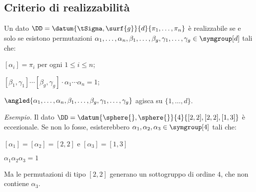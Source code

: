 \subsection{Criterio di realizzabilità}
\begin{frame}
\begin{mybox}
Un dato $\DD=\datum{\tSigma,\surf{g}}{d}{\pi_1,\ldots,\pi_n}$ è realizzabile se e solo se esistono permutazioni $\alpha_1,\ldots,\alpha_n,\allowbreak\beta_1,\ldots,\beta_g,\allowbreak\gamma_1,\ldots,\gamma_g\in\symgroup[d]$ tali che:
\begin{enumroman}
\item $[\alpha_i]=\pi_i$ per ogni $1\le i\le n$;
\item $[\beta_1,\gamma_1]\cdots[\beta_g,\gamma_g]\cdot\alpha_1\cdots\alpha_n=1$;
\item $\angled{\alpha_1,\ldots,\alpha_n,\beta_1,\ldots,\beta_g,\gamma_1,\ldots,\gamma_g}$ agisca  su $\{1,\ldots,d\}$.
\end{enumroman}
\end{mybox}
\vspace{.5em}
\emph{Esempio.} Il dato $\DD=\datum{\sphere{},\sphere{}}{4}{[2,2],[2,2],[1,3]}$ è eccezionale. Se non lo fosse, esisterebbero $\alpha_1,\alpha_2,\alpha_3\in\symgroup[4]$ tali che:
\begin{enumroman}
\item $[\alpha_1]=[\alpha_2]=[2,2]$ e $[\alpha_3]=[1,3]$
\item $\alpha_1\alpha_2\alpha_3=1$
\end{enumroman}
Ma le permutazioni di tipo $[2,2]$ generano un sottogruppo di ordine $4$, che non contiene $\alpha_3$. %
\end{frame}

